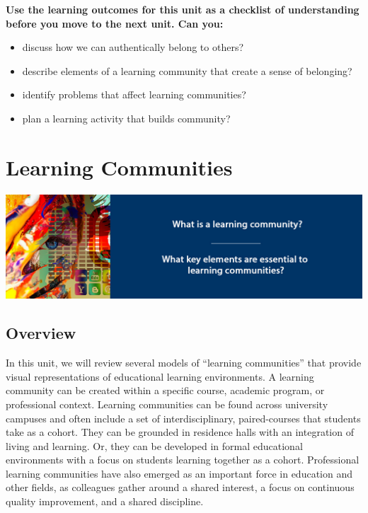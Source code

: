 \documentclass[
]{book}
\providecommand{\tightlist}{%
  \setlength{\itemsep}{0pt}\setlength{\parskip}{0pt}}
\begin{document}
\begin{progress}
\textbf{Use the learning outcomes for this unit as a checklist of understanding before you move to the next unit. Can you:}

\begin{itemize}
\tightlist
\item
  discuss how we can authentically belong to others?\\
\item
  describe elements of a learning community that create a sense of belonging?\\
\item
  identify problems that affect learning communities?\\
\item
  plan a learning activity that builds community?
\end{itemize}
\end{progress}

\hypertarget{learning-communities}{%
\chapter{Learning Communities}\label{learning-communities}}

\includegraphics{assets/unit4/LDRS664-BannerUnit4.jpg}

\hypertarget{overview-3}{%
\section*{Overview}\label{overview-3}}

In this unit, we will review several models of ``learning communities'' that provide visual representations of educational learning environments. A learning community can be created within a specific course, academic program, or professional context. Learning communities can be found across university campuses and often include a set of interdisciplinary, paired-courses that students take as a cohort. They can be grounded in residence halls with an integration of living and learning. Or, they can be developed in formal educational environments with a focus on students learning together as a cohort. Professional learning communities have also emerged as an important force in education and other fields, as colleagues gather around a shared interest, a focus on continuous quality improvement, and a shared discipline.
\end{document}

